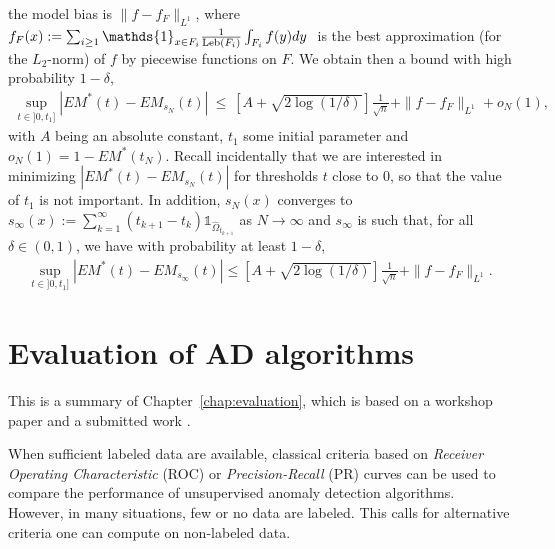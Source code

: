 the model bias is $\|f-f_{F}\|_{L^1}$, where $f_{F}(x) := \sum_{i \ge 1} \mathds{1}_{x \in F_i} \frac{1}{\leb(F_i)} \int_{F_i}f(y)dy~$ is the best approximation (for the $L_2$-norm) of $f$ by piecewise functions on $F$.
We obtain then a bound with high probability $1-\delta$,
\begin{align*}
\sup_{t \in ]0,t_1]}|EM^*(t)-EM_{s_N}(t)| ~\le~ \left[A+\sqrt{2\log(1/\delta)}\right]\frac{1}{\sqrt n} + \|f-f_{F}\|_{L^1}  + o_N(1), 
\end{align*}
with $A$ being an absolute constant, $t_1$ some initial parameter and $o_N(1)=1-EM^*(t_N)$. 
Recall incidentally that we are interested in minimizing $|EM^*(t)-EM_{s_N}(t)|$ for thresholds $t$ close to $0$, so that the value of $t_1$ is not important.
In addition, $s_N(x)$ converges to $s_\infty(x):=\sum_{k=1}^{\infty} (t_{k+1}-t_k)\mathds{1}_{\hat \Omega_{t_{k+1}}}$ as $N \rightarrow \infty$ and $s_\infty$ is such that, for all $\delta \in (0,1)$, we have with probability at least $1-\delta$,
\begin{align*}
\sup_{t \in ]0,t_1]}|EM^*(t)-EM_{s_\infty}(t)| \le \left[A+\sqrt{2\log(1/\delta)}\right]\frac{1}{\sqrt n} + \|f-f_{F}\|_{L^1}.
\end{align*}





\section{Evaluation of AD algorithms}
\label{resume:evaluation}
This is a summary of Chapter~\ref{chap:evaluation}, which is based on a workshop paper \citep{ICMLworkshop16} and a submitted work \citep{NIPS16evaluation}.


When sufficient labeled data are available, classical criteria based on \emph{Receiver Operating Characteristic} (ROC) or \emph{Precision-Recall} (PR) curves can be used to compare the performance of unsupervised anomaly detection algorithms. However, in many situations, few or no data are labeled. This calls for alternative criteria one can compute on non-labeled data.

